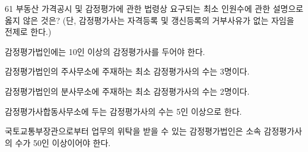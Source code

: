\begin{question}{61}
부동산 가격공시 및 감정평가에 관한 법령상 요구되는 최소 인원수에 관한 설명으로 옳지 않은 것은? (단, 감정평가사는 자격등록 및 갱신등록의 거부사유가 없는 자임을 전제로 한다.)
\begin{choices}
  \item 감정평가법인에는 10인 이상의 감정평가사를 두어야 한다.
  \item 감정평가법인의 주사무소에 주재하는 최소 감정평가사의 수는 3명이다.
  \item 감정평가법인의 분사무소에 주재하는 최소 감정평가사의 수는 2명이다.
  \item 감정평가사합동사무소에 두는 감정평가사의 수는 5인 이상으로 한다.
  \item 국토교통부장관으로부터 업무의 위탁을 받을 수 있는 감정평가법인은 소속 감정평가사의 수가 50인 이상이어야 한다.
\end{choices}
\end{question}

